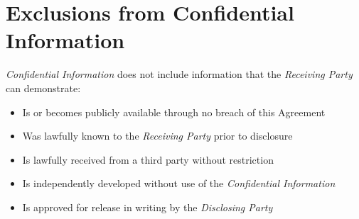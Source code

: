 
\section{Exclusions from Confidential Information}
\label{sec:exclusion}

\textit{Confidential Information} does not include information that the \textit{Receiving Party} can demonstrate:
\begin{itemize}
  \item Is or becomes publicly available through no breach of this Agreement
  \item Was lawfully known to the \textit{Receiving Party} prior to disclosure
  \item Is lawfully received from a third party without restriction
  \item Is independently developed without use of the \textit{Confidential Information}
  \item Is approved for release in writing by the \textit{Disclosing Party}
\end{itemize}

